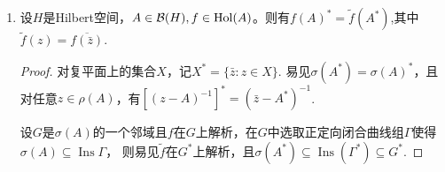 \begin{enumerate}
\begin{proof}
        由$g$在$\sigma(T)$上无零点可知$\frac{1}{g}\in\hol(T)$，利用Riesz函数演算可知$g(T)$可逆.
        然而，$\alpha\in\sigma_p(f(T))$表明$f(T)-\alpha$不是单射，因此存在$1\leqslant j\leqslant n$使得$T-z_j$不是单射，故$\alpha=f(z_j)\in f(\sigma_p(T))$.

        (iv)是(ii)和(iii)的直接推论.
    \end{proof}
    \item 设$H$是Hilbert空间，$A\in\mathcal{B}(H),f\in\mathrm{Hol}(A)$。则有$f(A)^{*}=\tilde{f}(A^{*})$,其中$\tilde{f}(z)=\overline{f(\bar{z})}$.
    \begin{proof}
        对复平面上的集合$X$，记$X^*=\{\bar{z}:z\in X\}$. 易见$\sigma(A^*)=\sigma(A)^*$，且对任意$z\in\rho(A)$，有$[(z-A)^{-1}]^*=(\bar{z}-A^*)^{-1}$.

        设$G$是$\sigma(A)$的一个邻域且$f$在$G$上解析，在$G$中选取正定向闭合曲线组$\varGamma$使得$\sigma(A)\subseteq\operatorname{Ins}\varGamma$，
        则易见$\tilde{f}$在$G^*$上解析，且$\sigma(A^*)\subseteq\operatorname{Ins}(\varGamma^*)\subseteq G^*$.


\end{proof}
\end{enumerate}
